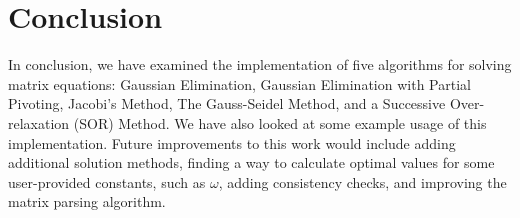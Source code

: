 \documentclass[12pt]{article}
\begin{document}
\section{Conclusion}
In conclusion, we have examined the implementation of 
 five algorithms for solving matrix equations: Gaussian Elimination, Gaussian Elimination with
Partial Pivoting, Jacobi's Method, The Gauss-Seidel Method, and a 
Successive Over-relaxation (SOR) Method. We have also looked at some example 
usage of this implementation. Future improvements to this work would include
adding additional solution methods, finding a way to calculate optimal values 
for some user-provided constants, such as $\omega$, adding consistency checks, 
and improving the matrix parsing algorithm.

\newpage

\nocite{*}
\end{document}
